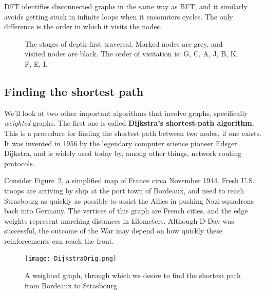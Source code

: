 DFT identifies disconnected graphs in the same way as BFT, and it similarly
avoids getting stuck in infinite loops when it encounters cycles. The only
difference is the order in which it visits the nodes.

\afterpage{\clearpage}

\begin{figure}[ht]
\centering
\begin{custommargins}{-1.4cm}{-1.8cm}

\caption{The stages of depth-first traversal. Marked nodes are grey, and
visited nodes are black. The order of visitation is: G, C, A, J, B, K, F,
E, I.}
\label{DFT}
\end{custommargins}
\end{figure}

\subsection{Finding the shortest path}

We'll look at two other important algorithms that involve graphs,
specifically \textit{weighted} graphs. The first one is called
\textbf{Dijkstra's shortest-path algorithm.} This is a procedure for
finding the shortest path between two nodes, if one exists. It was invented
in 1956 by the legendary computer science pioneer Edsger Dijkstra, and is
widely used today by, among other things, network routing protocols.

Consider Figure~\ref{france}, a simplified map of France circa November
1944. Fresh U.S. troops are arriving by ship at the port town of Bordeaux,
and need to reach Strasbourg as quickly as possible to assist the Allies in
pushing Nazi squadrons back into Germany. The vertices of this graph are
French cities, and the edge weights represent marching distances in
kilometers. Although D-Day was successful, the outcome of the War may
depend on how quickly these reinforcements can reach the front.

\begin{figure}[ht]
\centering
\texttt{[image: DijkstraOrig.png]}
\caption{A weighted graph, through which we desire to find the shortest
path from Bordeaux to Strasbourg.}
\label{france}
\end{figure}

